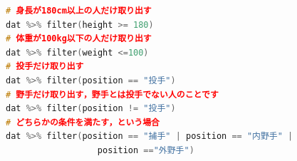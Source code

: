 \begin{lstlisting}[language=c++,label={code:usingR_filter2},caption={filter関数}]
# 身長が180cm以上の人だけ取り出す
dat %>% filter(height >= 180)
# 体重が100kg以下の人だけ取り出す
dat %>% filter(weight <=100)
# 投手だけ取り出す
dat %>% filter(position == "投手")
# 野手だけ取り出す，野手とは投手でない人のことです
dat %>% filter(position != "投手")
# どちらかの条件を満たす，という場合
dat %>% filter(position == "捕手" | position == "内野手" | 
                  position =="外野手")
\end{lstlisting}
